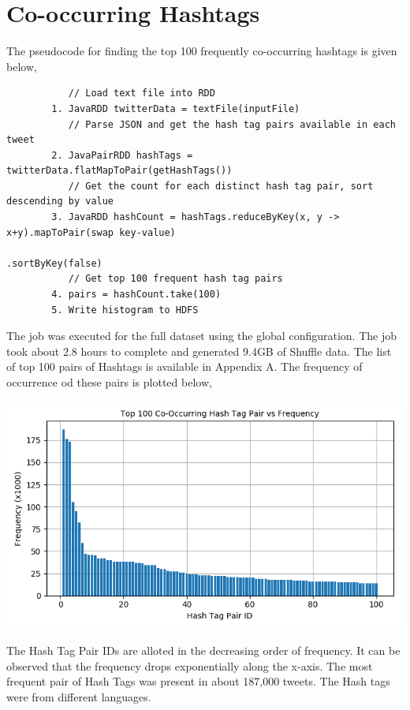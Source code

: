 \documentclass[11pt,a4paper,oneside]{article}
\begin{document}
	\section{Co-occurring Hashtags}
	The pseudocode for finding the top 100 frequently co-occurring hashtags is given below,
	
	\begin{verbatim}
	       // Load text file into RDD
	    1. JavaRDD twitterData = textFile(inputFile)
	       // Parse JSON and get the hash tag pairs available in each tweet
	    2. JavaPairRDD hashTags = twitterData.flatMapToPair(getHashTags()) 
	       // Get the count for each distinct hash tag pair, sort descending by value
	    3. JavaRDD hashCount = hashTags.reduceByKey(x, y -> x+y).mapToPair(swap key-value)
	                                                            .sortByKey(false)
	       // Get top 100 frequent hash tag pairs
	    4. pairs = hashCount.take(100)
	    5. Write histogram to HDFS 
	\end{verbatim}
	
	The job was executed for the full dataset using the global configuration. The job took about 2.8 hours to complete and generated 9.4GB of Shuffle data. The list of top 100 pairs of Hashtags is available in Appendix A. The frequency of occurrence od these pairs is plotted below, 
	
	 \begin{center}
		\includegraphics[scale=0.5]{2.png}		
	\end{center}

    The Hash Tag Pair IDs are alloted in the decreasing order of frequency. It can be observed that the frequency drops exponentially along the x-axis. The most frequent pair of Hash Tags was present in about 187,000 tweets. The Hash tags were from different languages.
    
\end{document}
